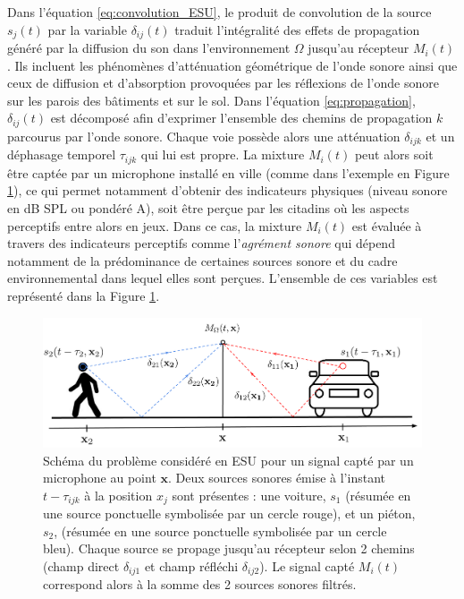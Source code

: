 Dans l'équation \ref{eq:convolution_ESU}, le produit de convolution de la source $s_j(t)$ par la variable $\delta_{ij}(t)$ traduit l'intégralité des effets de propagation généré par la diffusion du son dans l'environnement $\Omega$ jusqu'au récepteur $M_i(t)$. Ils incluent les phénomènes d'atténuation géométrique de l'onde sonore ainsi que ceux de diffusion et d'absorption provoquées par les réflexions de l'onde sonore sur les parois des bâtiments et sur le sol.
Dans l'équation \ref{eq:propagation}, $\delta_{ij}(t)$ est décomposé afin d'exprimer l'ensemble des chemins de propagation $k$ parcourus par l'onde sonore. Chaque voie possède alors une atténuation $\delta_{ijk}$ et un déphasage temporel $\tau_{ijk}$ qui lui est propre. 
La mixture $M_{i}(t)$ peut alors soit être captée par un microphone installé en ville (comme dans l'exemple en Figure \ref{fig:schema_ville}), ce qui permet notamment d'obtenir des indicateurs physiques (niveau sonore en dB SPL ou pondéré A), soit être perçue par les citadins où les aspects perceptifs entre alors en jeux. Dans ce cas, la mixture $M_{i}(t)$ est évaluée à travers des indicateurs perceptifs comme l'\textit{agrément sonore} qui dépend notamment de la prédominance de certaines sources sonore et du cadre environnemental dans lequel elles sont perçues. L'ensemble de ces variables est représenté dans la Figure \ref{fig:schema_ville}. 

\begin{figure}[hbtp]
\centering
\includegraphics[width=.9\linewidth]{./figures/autres/schema_ville_propa.pdf}
\caption{Schéma du problème considéré en ESU pour un signal capté par un microphone au point $\mathbf{x}$. Deux sources sonores émise à l'instant $t-\tau_{ijk}$ à la position $x_j$ sont présentes : une voiture, $s_{1}$ (résumée en une source ponctuelle symbolisée par un cercle rouge), et un piéton, $s_2$, (résumée en une source ponctuelle symbolisée par un cercle bleu). Chaque source se propage jusqu'au récepteur selon 2 chemins (champ direct $\delta_{ij1}$ et champ réfléchi $\delta_{ij2}$). Le signal capté $M_{i}(t)$ correspond alors à la somme des 2 sources sonores filtrés.}
\label{fig:schema_ville}
\end{figure}

